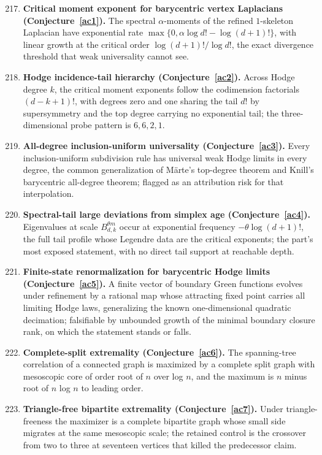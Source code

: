 \documentclass[11pt]{article}
\theoremstyle{definition}
\begin{document}
\begin{enumerate}\setcounter{enumi}{216}
\item \textbf{Critical moment exponent for barycentric vertex Laplacians (Conjecture~\ref{ac1}).}  The spectral $\alpha$-moments of the refined $1$-skeleton Laplacian have exponential rate $\max\{0,\alpha\log d!-\log(d+1)!\}$, with linear growth at the critical order $\log(d+1)!/\log d!$, the exact divergence threshold that weak universality cannot see.
\item \textbf{Hodge incidence-tail hierarchy (Conjecture~\ref{ac2}).}  Across Hodge degree $k$, the critical moment exponents follow the codimension factorials $(d-k+1)!$, with degrees zero and one sharing the tail $d!$ by supersymmetry and the top degree carrying no exponential tail; the three-dimensional probe pattern is $6,6,2,1$.
\item \textbf{All-degree inclusion-uniform universality (Conjecture~\ref{ac3}).}  Every inclusion-uniform subdivision rule has universal weak Hodge limits in every degree, the common generalization of M\"arte's top-degree theorem and Knill's barycentric all-degree theorem; flagged as an attribution risk for that interpolation.
\item \textbf{Spectral-tail large deviations from simplex age (Conjecture~\ref{ac4}).}  Eigenvalues at scale $B_{d,k}^{\theta m}$ occur at exponential frequency $-\theta\log(d+1)!$, the full tail profile whose Legendre data are the critical exponents; the part's most exposed statement, with no direct tail support at reachable depth.
\item \textbf{Finite-state renormalization for barycentric Hodge limits (Conjecture~\ref{ac5}).}  A finite vector of boundary Green functions evolves under refinement by a rational map whose attracting fixed point carries all limiting Hodge laws, generalizing the known one-dimensional quadratic decimation; falsifiable by unbounded growth of the minimal boundary closure rank, on which the statement stands or falls.
\item \textbf{Complete-split extremality (Conjecture~\ref{ac6}).}  The spanning-tree correlation of a connected graph is maximized by a complete split graph with mesoscopic core of order root of $n$ over log $n$, and the maximum is $n$ minus root of $n$ log $n$ to leading order.
\item \textbf{Triangle-free bipartite extremality (Conjecture~\ref{ac7}).}  Under triangle-freeness the maximizer is a complete bipartite graph whose small side migrates at the same mesoscopic scale; the retained control is the crossover from two to three at seventeen vertices that killed the predecessor claim.

\end{enumerate}
\end{document}
